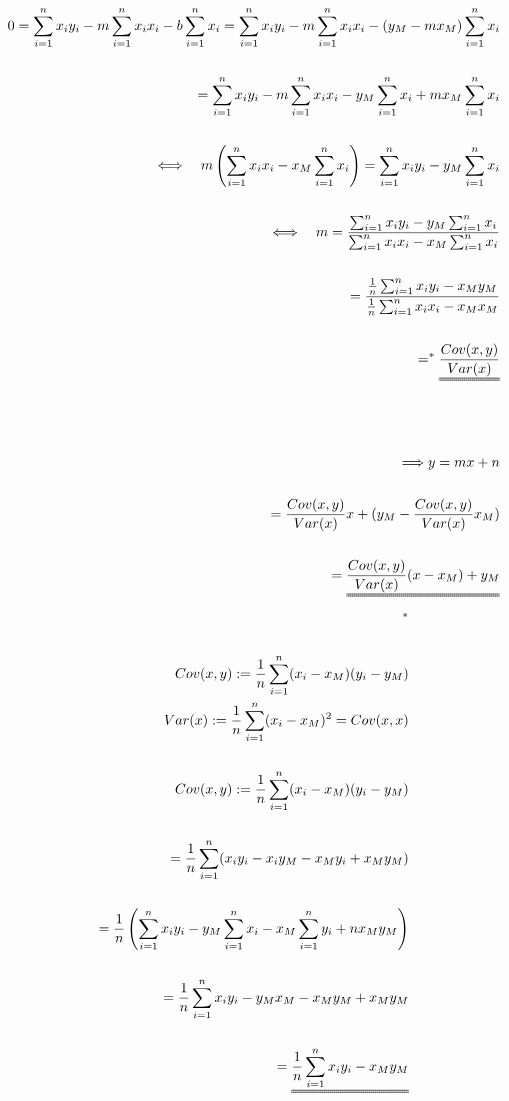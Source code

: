 \documentclass[a4paper]{article}
\begin{document}
\begin{align*}
0=\sum_{i=1}^{n}x_iy_i-m\sum_{i=1}^{n}x_ix_i-b\sum_{i=1}^{n}x_i=\sum_{i=1}^{n}x_iy_i-m\sum_{i=1}^{n}x_ix_i-(y_M-mx_M)\sum_{i=1}^{n}x_i
\\\\
=\sum_{i=1}^{n}x_iy_i-m\sum_{i=1}^{n}x_ix_i-y_M\sum_{i=1}^{n}x_i+mx_M\sum_{i=1}^{n}x_i
\\\\
\Longleftrightarrow \quad m\left(\sum_{i=1}^{n}x_ix_i-x_M\sum_{i=1}^{n}x_i\right)=\sum_{i=1}^{n}x_iy_i-y_M\sum_{i=1}^{n}x_i
\\\\
\Longleftrightarrow \quad m=\frac{\sum_{i=1}^{n}x_iy_i-y_M\sum_{i=1}^{n}x_i}{\sum_{i=1}^{n}x_ix_i-x_M\sum_{i=1}^{n}x_i}
\\\\
=\frac{\frac{1}{n}\sum_{i=1}^{n}x_iy_i-x_My_M}{\frac{1}{n}\sum_{i=1}^{n}x_ix_i-x_Mx_M}
\\\\
=^*\uuline{\frac{Cov(x,y)}{Var(x)}}
\\\\\\\\
\Longrightarrow y=mx+n
\\\\
=\frac{Cov(x,y)}{Var(x)}x+(y_M-\frac{Cov(x,y)}{Var(x)}x_M)
\\\\
=\uuline{\frac{Cov(x,y)}{Var(x)}(x-x_M)+y_M}
\end{align*}
\newpage
\begin{align*}
^*
\\\\
Cov(x,y):=\frac{1}{n}\sum_{i=1}^{n}(x_i-x_M)(y_i-y_M)
\\
Var(x):=\frac{1}{n}\sum_{i=1}^{n}(x_i-x_M)^2=Cov(x,x)
\\\\
Cov(x,y):=\frac{1}{n}\sum_{i=1}^{n}(x_i-x_M)(y_i-y_M)
\\\\
=\frac{1}{n}\sum_{i=1}^{n}(x_iy_i-x_iy_M-x_My_i+x_My_M)
\\\\
=\frac{1}{n}\left(\sum_{i=1}^{n}x_iy_i-y_M\sum_{i=1}^{n}x_i-x_M\sum_{i=1}^{n}y_i+nx_My_M\right)
\\\\
=\frac{1}{n}\sum_{i=1}^{n}x_iy_i-y_Mx_M-x_My_M+x_My_M
\\\\
=\uuline{\frac{1}{n}\sum_{i=1}^{n}x_iy_i-x_My_M}
\end{align*}
\newpage
\end{document}

